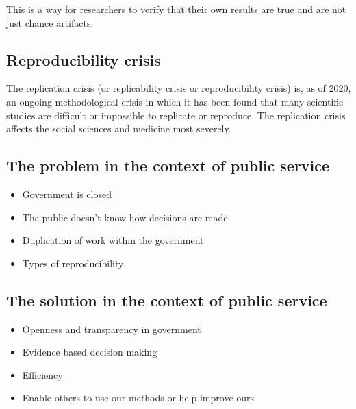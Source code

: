 \documentclass[
]{book}
\providecommand{\tightlist}{%
  \setlength{\itemsep}{0pt}\setlength{\parskip}{0pt}}
\begin{document}
This is a way for researchers to verify that their own results are true and are not just chance artifacts.

\hypertarget{reproducibility-crisis}{%
\subsection{Reproducibility crisis}\label{reproducibility-crisis}}

The replication crisis (or replicability crisis or reproducibility crisis) is, as of 2020, an ongoing methodological crisis in which it has been found that many scientific studies are difficult or impossible to replicate or reproduce. The replication crisis affects the social sciences and medicine most severely.

\hypertarget{the-problem-in-the-context-of-public-service}{%
\subsection{The problem in the context of public service}\label{the-problem-in-the-context-of-public-service}}

\begin{itemize}
\tightlist
\item
  Government is closed\\
\item
  The public doesn't know how decisions are made
\item
  Duplication of work within the government
\item
  Types of reproducibility
\end{itemize}

\hypertarget{the-solution-in-the-context-of-public-service}{%
\subsection{The solution in the context of public service}\label{the-solution-in-the-context-of-public-service}}

\begin{itemize}
\tightlist
\item
  Openness and transparency in government\\
\item
  Evidence based decision making\\
\item
  Efficiency\\
\item
  Enable others to use our methods or help improve ours
\end{itemize}
\end{document}
